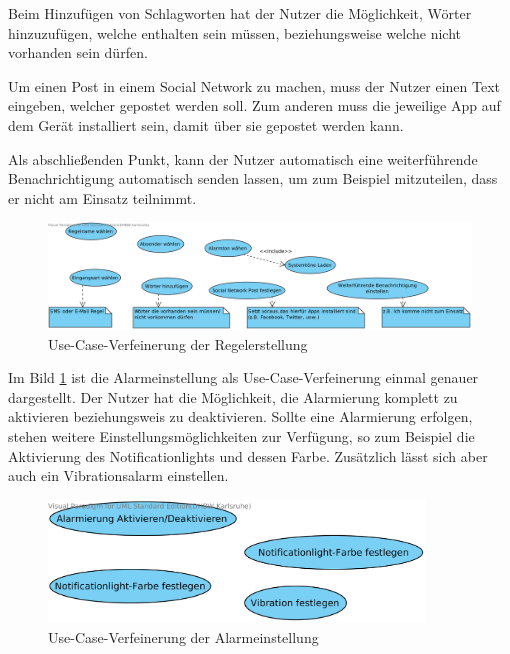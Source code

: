 Beim Hinzuf\"ugen von Schlagworten hat der Nutzer die M\"oglichkeit, W\"orter hinzuzuf\"ugen, welche enthalten sein m\"ussen, beziehungsweise welche nicht vorhanden sein d\"urfen. 

Um einen Post in einem Social Network zu machen, muss der Nutzer einen Text eingeben, welcher gepostet werden soll. Zum anderen muss die jeweilige App auf dem Ger\"at installiert sein, damit \"uber sie gepostet werden kann.

Als abschlie\ss{}enden Punkt, kann der Nutzer automatisch eine weiterf\"uhrende Benachrichtigung automatisch senden lassen, um zum Beispiel mitzuteilen, dass er nicht am Einsatz teilnimmt.
\begin{figure}[!ht]
\centering
\includegraphics[width=16cm]{Bilder/UseCaseRegelerstellung.png}
\caption{Use-Case-Verfeinerung der Regelerstellung}
\label{Regelerstellung Use Case}
\centering
\end{figure}

\FloatBarrier
Im Bild \ref{Regelerstellung Use Case} ist die Alarmeinstellung als Use-Case-Verfeinerung einmal genauer dargestellt. Der Nutzer hat die M\"oglichkeit, die Alarmierung komplett zu aktivieren beziehungsweis zu deaktivieren. Sollte eine Alarmierung erfolgen, stehen weitere Einstellungsm\"oglichkeiten zur Verf\"ugung, so zum Beispiel die Aktivierung des Notificationlights und dessen Farbe. Zus\"atzlich l\"asst sich aber auch ein Vibrationsalarm einstellen.
\begin{figure}[!ht]
\centering
\includegraphics[width=10cm]{Bilder/UseCaseAlarmeinstellung.png}
\caption{Use-Case-Verfeinerung der Alarmeinstellung}
\label{Alarmeinstellung Use Case}
\centering
\end{figure}

